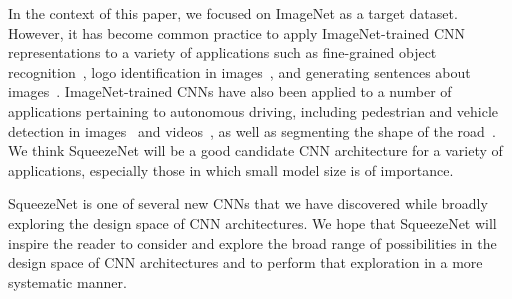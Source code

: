 \documentclass{article} \usepackage{iclr2017_conference,times}
\renewcommand{\cite}{\citep}
\begin{document}
In the context of this paper, we focused on ImageNet as a target dataset.
However, it has become common practice to apply ImageNet-trained CNN representations to a variety of applications such as fine-grained object recognition~\cite{DPD, decaf}, logo identification in images~\cite{DeepLogo}, and generating sentences about images~\cite{forrestMicrosoft}.
ImageNet-trained CNNs have also been applied to a number of applications pertaining to autonomous driving, including pedestrian and vehicle detection in images~\cite{DenseNet,DPMareCNN,Ashraf2016} and videos~\cite{Urtasun2015}, as well as segmenting the shape of the road~\cite{SegNet}. 
We think SqueezeNet will be a good candidate CNN architecture for a variety of applications, especially those in which small model size is of importance.

SqueezeNet is one of several new CNNs that we have discovered while broadly exploring the design space of CNN architectures.
We hope that SqueezeNet will inspire the reader to consider and explore the broad range of possibilities in the design space of CNN architectures and to perform that exploration in a more systematic manner.









\end{document}

